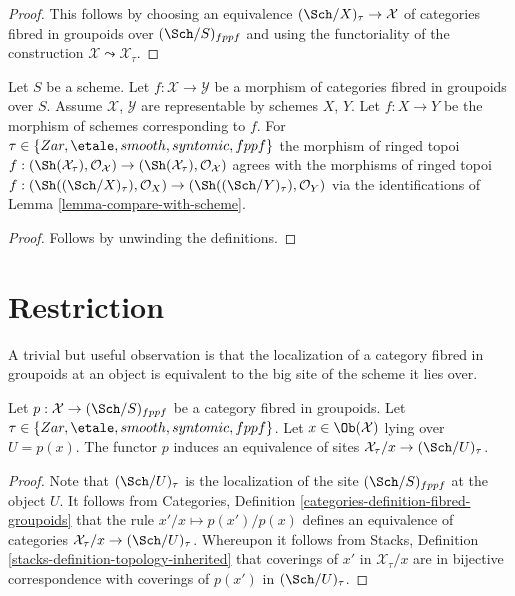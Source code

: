 \begin{proof}
This follows by choosing an equivalence
$(\Sch/X)_\tau \to \mathcal{X}$ of categories fibred in groupoids
over $(\Sch/S)_{fppf}$ and using the functoriality of
the construction $\mathcal{X} \leadsto \mathcal{X}_\tau$.
\end{proof}

\begin{lemma}
\label{lemma-compare-with-morphism-of-schemes}
Let $S$ be a scheme. Let $f : \mathcal{X} \to \mathcal{Y}$ be a morphism
of categories fibred in groupoids over $S$.
Assume $\mathcal{X}$, $\mathcal{Y}$ are representable by schemes
$X$, $Y$. Let $f : X \to Y$ be the morphism of schemes corresponding
to $f$. For $\tau \in \{Zar,\linebreak[0] \etale,\linebreak[0]
smooth,\linebreak[0] syntomic,\linebreak[0] fppf\}$
the morphism of ringed topoi
$f : (\Sh(\mathcal{X}_\tau), \mathcal{O}_\mathcal{X}) \to
(\Sh(\mathcal{X}_\tau), \mathcal{O}_\mathcal{X})$
agrees with the morphisms of ringed topoi
$f : (\Sh((\Sch/X)_\tau), \mathcal{O}_X) \to 
(\Sh((\Sch/Y)_\tau), \mathcal{O}_Y)$ via the identifications of
Lemma \ref{lemma-compare-with-scheme}.
\end{lemma}

\begin{proof}
Follows by unwinding the definitions.
\end{proof}




\section{Restriction}
\label{section-restriction}


\noindent
A trivial but useful observation is that the localization
of a category fibred in groupoids at an object
is equivalent to the big site of the scheme it lies over.

\begin{lemma}
\label{lemma-localizing}
Let $p : \mathcal{X} \to (\Sch/S)_{fppf}$ be a category fibred
in groupoids. Let $\tau \in \{Zar, \etale, smooth, syntomic, fppf\}$.
Let $x \in \Ob(\mathcal{X})$ lying over $U = p(x)$.
The functor $p$ induces an equivalence of sites
$\mathcal{X}_\tau/x \to (\Sch/U)_\tau$.
\end{lemma}

\begin{proof}
Note that $(\Sch/U)_\tau$ is the localization of the site
$(\Sch/S)_{fppf}$ at the object $U$. It follows from
Categories, Definition \ref{categories-definition-fibred-groupoids}
that the rule $x'/x \mapsto p(x')/p(x)$ defines an equivalence of
categories $\mathcal{X}_\tau/x \to (\Sch/U)_\tau$.
Whereupon it follows from
Stacks, Definition \ref{stacks-definition-topology-inherited}
that coverings of $x'$ in $\mathcal{X}_\tau/x$ are in bijective correspondence
with coverings of $p(x')$ in $(\Sch/U)_\tau$.
\end{proof}

